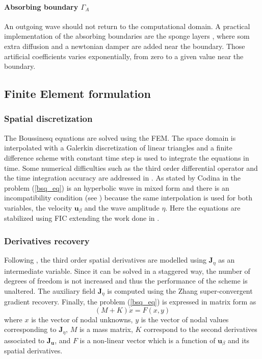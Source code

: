 \paragraph{Absorbing boundary $\Gamma_A$} An outgoing wave should not return to the computational domain. A practical implementation of the absorbing boundaries are the sponge layers \cite{israeli1981, wei1995}, where som extra diffusion and a newtonian damper are added near the boundary. Those artificial coefficients varies exponentially, from zero to a given value near the boundary.



\subsection{Finite Element formulation}

\subsubsection{Spatial discretization}

The Boussinesq equations are solved using the FEM. The space domain is interpolated with a Galerkin discretization of linear triangles and a finite difference scheme with constant time step is used to integrate the equations in time.
Some numerical difficulties such as the third order differential operator and the time integration accuracy are addressed in \cite{walkley2002,woo2004a,wei1995}.
As stated by Codina in \cite{codina2008,codina2008b} the problem (\ref{bsq_eq}) is an hyperbolic wave in mixed form and there is an incompatibility condition (see \cite{BrezziFortin}) because the same interpolation is used for both variables, the velocity $\mathbf{u}_\beta$ and the wave amplitude $\eta$.
Here the equations are stabilized using FIC extending the work done in \cite{maso2022}.


\subsubsection{Derivatives recovery}

Following \cite{walkley2002}, the third order spatial derivatives are modelled using $\mathbf{J}_\eta$ as an intermediate variable. Since it can be solved in a staggered way, the number of degrees of freedom is not increased and thus the performance of the scheme is unaltered. The auxiliary field $\mathbf{J}_\eta$ is computed using the Zhang \cite{zhang2005} super-convergent gradient recovery.
Finally, the problem (\ref{bsq_eq}) is expressed in matrix form as
\begin{equation} \label{sw_system_matrix}
    (M + K) \dot{x} = F(x,y)
\end{equation} 
where $x$ is the vector of nodal unknowns, $y$ is the vector of nodal values corresponding to $\mathbf{J}_\eta$, $M$ is a mass matrix, $K$ correspond to the second derivatives associated to $\mathbf{J}_{\mathbf{u}}$, and $F$ is a non-linear vector which is a function of $\mathbf{u}_\beta$ and its spatial derivatives.


